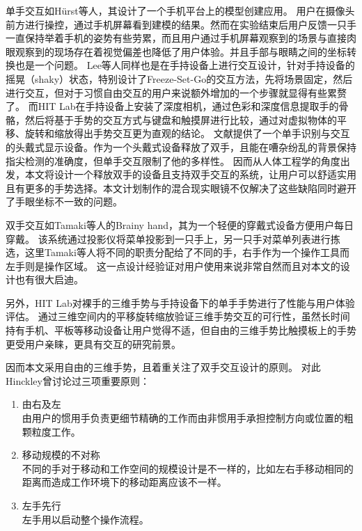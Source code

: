 单手交互如H{\"u}rst等人，其设计了一个手机平台上的模型创建应用。
用户在摄像头前方进行操控，通过手机屏幕看到建模的结果。然而在实验结束后用户反馈一只手一直保持举着手机的姿势有些劳累，而且用户通过手机屏幕观察到的场景与直接肉眼观察到的现场存在着视觉偏差也降低了用户体验。并且手部与眼睛之间的坐标转换也是一个问题。
Lee等人同样也是在手持设备上进行交互设计，针对手持设备的摇晃（shaky）状态，特别设计了Freeze-Set-Go的交互方法，先将场景固定，然后进行交互，但对于习惯自由交互的用户来说额外增加的一个步骤就显得有些累赘了。
而HIT Lab在手持设备上安装了深度相机，通过色彩和深度信息提取手的骨骼，然后将基于手势的交互方式与键盘和触摸屏进行比较，通过对虚拟物体的平移、旋转和缩放得出手势交互更为直观的结论。
文献\cite{MIME}提供了一个单手识别与交互的头戴式显示设备。作为一个头戴式设备释放了双手，且能在嘈杂纷乱的背景保持指尖检测的准确度，但单手交互限制了他的多样性。
因而从人体工程学的角度出发，本文将设计一个释放双手的设备且支持双手交互的系统，让用户可以舒适实用且有更多的手势选择。本文计划制作的混合现实眼镜不仅解决了这些缺陷同时避开了手眼坐标不一致的问题。

双手交互如Tamaki等人的Brainy hand，其为一个轻便的穿戴式设备方便用户每日穿戴。
该系统通过投影仪将菜单投影到一只手上，另一只手对菜单列表进行拣选，这里Tamaki等人将不同的职责分配给了不同的手，右手作为一个操作工具而左手则是操作区域。
这一点设计经验证对用户使用来说非常自然而且对本文的设计也有很大启迪。

另外，HIT Lab对裸手的三维手势与手持设备下的单手手势进行了性能与用户体验评估。
通过三维空间内的平移旋转缩放验证三维手势交互的可行性，虽然长时间持有手机、平板等移动设备让用户觉得不适，但自由的三维手势比触摸板上的手势更受用户亲睐，更具有交互的研究前景。

因而本文采用自由的三维手势，且着重关注了双手交互设计的原则。
对此Hinckley曾讨论过三项重要原则：
\begin{enumerate}
	\item 由右及左 \hfill \\		由用户的惯用手负责更细节精确的工作而由非惯用手承担控制方向或位置的粗颗粒度工作。
	\item 移动规模的不对称 \hfill \\		不同的手对于移动和工作空间的规模设计是不一样的，比如左右手移动相同的距离而造成工作环境下的移动距离应该不一样。
	\item 左手先行 \hfill \\	
	左手用以启动整个操作流程。
\end{enumerate}

